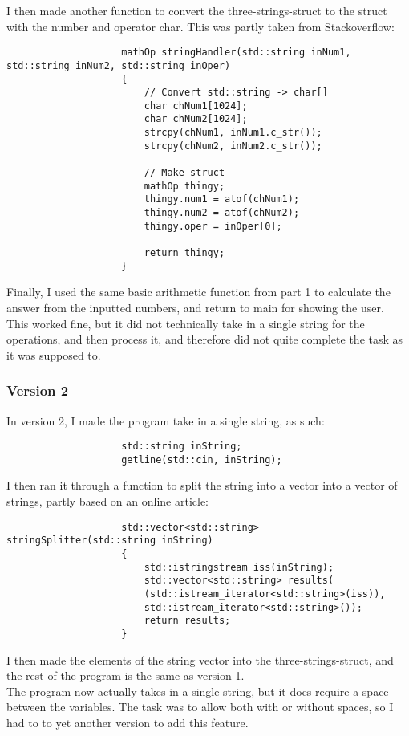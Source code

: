 \documentclass{article}
\begin{document}
				I then made another function to convert the three-strings-struct to the struct with the number and operator char. This was partly taken from Stackoverflow:
				\cite{cppConvStr2Chr}
				\begin{lstlisting}
					mathOp stringHandler(std::string inNum1, std::string inNum2, std::string inOper)
					{
						// Convert std::string -> char[]
						char chNum1[1024];
						char chNum2[1024];
						strcpy(chNum1, inNum1.c_str());
						strcpy(chNum2, inNum2.c_str());
						
						// Make struct
						mathOp thingy;
						thingy.num1 = atof(chNum1);
						thingy.num2 = atof(chNum2);
						thingy.oper = inOper[0];
						
						return thingy;
					}
				\end{lstlisting}
				
				Finally, I used the same basic arithmetic function from part 1 to calculate the answer from the inputted numbers, and return to main for showing the user. \\
				This worked fine, but it did not technically take in a single string for the operations, and then process it, and therefore did not quite complete the task as it was supposed to.
		
		
			\subsubsection{Version 2}
				In version 2, I made the program take in a single string, as such:
				\begin{lstlisting}
					std::string inString;
					getline(std::cin, inString);
				\end{lstlisting}
				
				I then ran it through a function to split the string into a vector into a vector of strings, partly based on an online article: \cite{cppSplitStr}
				\begin{lstlisting}
					std::vector<std::string> stringSplitter(std::string inString)
					{
						std::istringstream iss(inString);
						std::vector<std::string> results(
						(std::istream_iterator<std::string>(iss)),
						std::istream_iterator<std::string>());
						return results;
					}
				\end{lstlisting}
				
				I then made the elements of the string vector into the three-strings-struct, and the rest of the program is the same as version 1. \\
				The program now actually takes in a single string, but it does require a space between the variables. The task was to allow both with or without spaces, so I had to to yet another version to add this feature.
			
\end{document}
